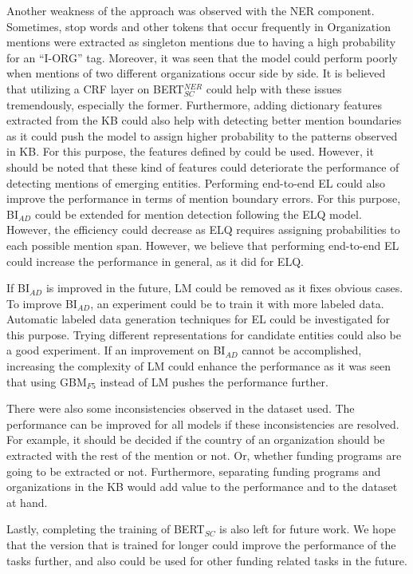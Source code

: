 \documentclass{report}
\theoremstyle{definition}
\theoremstyle{remark}
\begin{document}
Another weakness of the approach was observed with the NER component. Sometimes, stop words and other tokens that occur frequently in Organization mentions were extracted as singleton mentions due to having a high probability for an ``I-ORG'' tag. Moreover, it was seen that the model could perform poorly when mentions of two different organizations occur side by side. It is believed that utilizing a CRF layer on BERT$^{NER}_{SC}$ could help with these issues tremendously, especially the former. Furthermore, adding dictionary features extracted from the KB could also help with detecting better mention boundaries as it could push the model to assign higher probability to the patterns observed in KB. For this purpose, the features defined by \cite{MedDict} could be used. However, it should be noted that these kind of features could deteriorate the performance of detecting mentions of emerging entities. Performing end-to-end EL could also improve the performance in terms of mention boundary errors. For this purpose, BI$_{AD}$ could be extended for mention detection following the ELQ model. However, the efficiency could decrease as ELQ requires assigning probabilities to each possible mention span. However, we believe that performing end-to-end EL could increase the performance in general, as it did for ELQ.

If BI$_{AD}$ is improved in the future, LM could be removed as it fixes obvious cases. To improve BI$_{AD}$, an experiment could be to train it with more labeled data. Automatic labeled data generation techniques for EL could be investigated for this purpose. Trying different representations for candidate entities could also be a good experiment. If an improvement on BI$_{AD}$ cannot be accomplished, increasing the complexity of LM could enhance the performance as it was seen that using GBM$_{F5}$ instead of LM pushes the performance further. 

There were also some inconsistencies observed in the dataset used. The performance can be improved for all models if these inconsistencies are resolved. For example, it should be decided if the country of an organization should be extracted with the rest of the mention or not. Or, whether funding programs are going to be extracted or not. Furthermore, separating funding programs and organizations in the KB would add value to the performance and to the dataset at hand.

Lastly, completing the training of BERT$_{SC}$ is also left for future work. We hope that the version that is trained for longer could improve the performance of the tasks further, and also could be used for other funding related tasks in the future.
\end{document}
